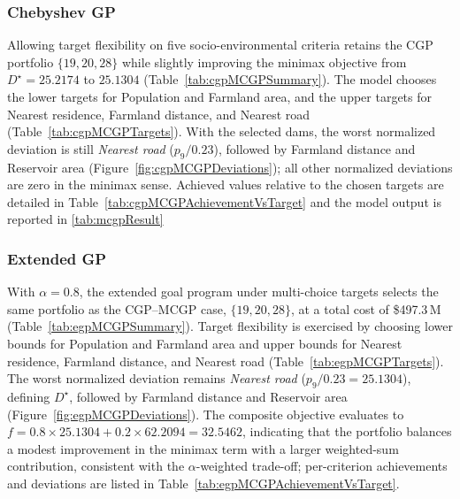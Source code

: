 \subsubsection{Chebyshev GP}
Allowing target flexibility on five socio-environmental criteria retains the CGP portfolio $\{19,20,28\}$ while slightly improving the minimax objective from $D^{\star}\!=\!25.2174$ to $25.1304$ (Table~\ref{tab:cgpMCGPSummary}). The model chooses the lower targets for Population and Farmland area, and the upper targets for Nearest residence, Farmland distance, and Nearest road (Table~\ref{tab:cgpMCGPTargets}). With the selected dams, the worst normalized deviation is still \emph{Nearest road} ($p_9/0.23$), followed by Farmland distance and Reservoir area (Figure~\ref{fig:cgpMCGPDeviations}); all other normalized deviations are zero in the minimax sense. Achieved values relative to the chosen targets are detailed in Table~\ref{tab:cgpMCGPAchievementVsTarget} and the model output is reported in \ref{tab:mcgpResult}






\subsubsection{Extended GP}
With $\alpha=0.8$, the extended goal program under multi-choice targets selects the same portfolio as the CGP--MCGP case, $\{19,20,28\}$, at a total cost of \$497.3\,M (Table~\ref{tab:egpMCGPSummary}). Target flexibility is exercised by choosing lower bounds for Population and Farmland area and upper bounds for Nearest residence, Farmland distance, and Nearest road (Table~\ref{tab:egpMCGPTargets}). The worst normalized deviation remains \emph{Nearest road} ($p_9/0.23=25.1304$), defining $D^{\star}$, followed by Farmland distance and Reservoir area (Figure~\ref{fig:egpMCGPDeviations}). The composite objective evaluates to $f=0.8\times 25.1304 + 0.2\times 62.2094 = 32.5462$, indicating that the portfolio balances a modest improvement in the minimax term with a larger weighted-sum contribution, consistent with the $\alpha$-weighted trade-off; per-criterion achievements and deviations are listed in Table~\ref{tab:egpMCGPAchievementVsTarget}.







